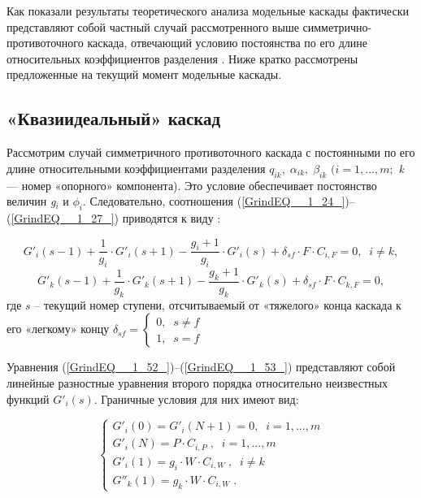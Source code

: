 Как показали результаты теоретического анализа модельные каскады фактически представляют собой частный случай рассмотренного выше симметрично-противоточного каскада, отвечающий условию постоянства по его длине относительных коэффициентов разделения \cite{sulaberidzeClassificationModelCascades2020}.  
Ниже кратко рассмотрены предложенные на текущий момент модельные каскады.

\subsection{«Квазиидеальный» каскад}

Рассмотрим случай симметричного противоточного каскада с постоянными по его длине относительными коэффициентами разделения $q_{ik} ,\; \alpha _{ik} ,\; \beta _{ik} $ $(i=1,...,m;$ \textit{k} --- номер «опорного» компонента). Это условие обеспечивает постоянство величин \textit{g${}_{i}$} и $\phi _{i} $. Следовательно, соотношения (\ref{GrindEQ__1_24_})--(\ref{GrindEQ__1_27_}) приводятся к виду \cite{sulaberidzeTeoriyaKaskadovDlya2011}:

\begin{equation} \label{GrindEQ__1_52_} 
  G'_{i} (s-1)+\frac{1}{g_{i}} \cdot G'_{i} (s+1)-\frac{g_{i} +1}{g_{i} }\cdot G'_{i} (s)+\delta _{sf} \cdot F \cdot C_{i,F} =0,\; \; i\ne k, 
  \end{equation} 
  \begin{equation} \label{GrindEQ__1_53_} 
  G'_{k} (s-1)+\frac{1}{g_{k}} \cdot G'_{k} (s+1)-\frac{g_{k} +1}{g_{k} }\cdot G'_{k} (s)+\delta _{sf} \cdot F \cdot C_{k,F} =0, 
\end{equation}
где $s$ – текущий номер ступени, отсчитываемый от «тяжелого» конца каскада к его «легкому» концу $\delta _{sf} =\left\{\begin{array}{l} {0,\; \; s\ne f} \\ {1,\; \; s=f} \end{array}\right.$

Уравнения (\ref{GrindEQ__1_52_})--(\ref{GrindEQ__1_53_}) представляют собой линейные разностные уравнения второго порядка относительно неизвестных функций $G'_{i} (s)$. Граничные условия для них имеют вид:

\begin{equation} \label{GrindEQ__1_54_} 
  \left\{\begin{array}{l} {G'_{i} (0)=G'_{i} (N+1)=0,\; \; i=1,...,m} \\
    {G'_{i} (N)=P \cdot C_{i,P} \; ,\; \; i=1,...,m} \\
    {G'_{i} (1)=g_{i} \cdot W \cdot C_{i,W} \; ,\; \; i\ne k} \\
    {G''_{k} (1)=g_{k} \cdot W \cdot C_{i,W} \; .} \end{array}\right.  
\end{equation} 

